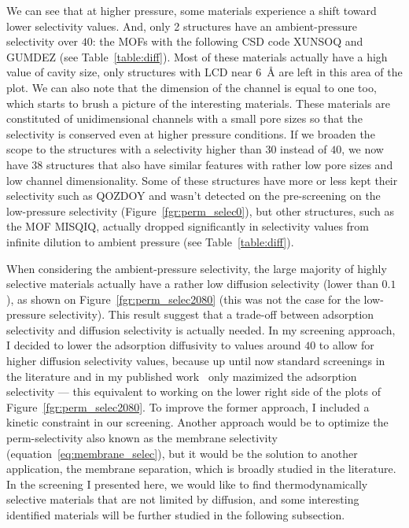 \documentclass[main]{subfiles}
\begin{document}
We can see that at higher pressure, some materials experience a shift toward lower selectivity values. And, only 2 structures have an ambient-pressure selectivity over $40$: the MOFs with the following CSD code XUNSOQ\autocite{Abrahams_2014} and GUMDEZ\autocite{Yin_2014}  (see Table~\ref{table:diff}). Most of these materials actually have a high value of cavity size, only structures with LCD near \SI{6}{\angstrom} are left in this area of the plot. We can also note that the dimension of the channel is equal to one too, which starts to brush a picture of the interesting materials. These materials are constituted of unidimensional channels with a small pore sizes so that the selectivity is conserved even at higher pressure conditions. If we broaden the scope to the structures with a selectivity higher than $30$ instead of $40$, we now have 38 structures that also have similar features with rather low pore sizes and low channel dimensionality. Some of these structures have more or less kept their selectivity such as QOZDOY\autocite{Zhang_2001} and wasn't detected on the pre-screening on the low-pressure selectivity (Figure~\ref{fgr:perm_selec0}), but other structures, such as the MOF MISQIQ\autocite{Tong_2013}, actually dropped significantly in selectivity values from infinite dilution to ambient pressure (see Table~\ref{table:diff}). 

When considering the ambient-pressure selectivity, the large majority of highly selective materials actually have a rather low diffusion selectivity (lower than $0.1$), as shown on Figure~\ref{fgr:perm_selec2080} (this was not the case for the low-pressure selectivity). This result suggest that a trade-off between adsorption selectivity and diffusion selectivity is actually needed. In my screening approach, I decided to lower the adsorption diffusivity to values around $40$ to allow for higher diffusion selectivity values, because up until now standard screenings in the literature\autocite{Simon_2015,Chung_2019} and in my published work~\cite{Ren_2021} only mazimized the adsorption selectivity --- this equivalent to working on the lower right side of the plots of Figure~\ref{fgr:perm_selec2080}. To improve the former approach, I included a kinetic constraint in our screening. Another approach would be to optimize the perm-selectivity also known as the membrane selectivity (equation~\ref{eq:membrane_selec}), but it would be the solution to another application, the membrane separation, which is broadly studied in the literature\autocite{Anderson_2017,Wang_2022}. In the screening I presented here, we would like to find thermodynamically selective materials that are not limited by diffusion, and some interesting identified materials will be further studied in the following subsection. 
\end{document}
